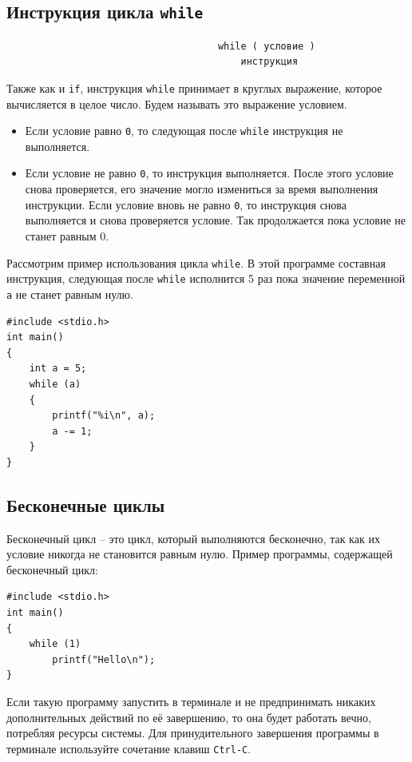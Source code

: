 \documentclass{article}
\begin{document}
\subsection*{Инструкция цикла \texttt{while}}
\begin{lstlisting}
                                     while ( условие )
                                         инструкция
\end{lstlisting}
Также как и \texttt{if}, инструкция \texttt{while} принимает в круглых выражение, которое вычисляется в целое число. Будем называть это выражение условием.
\begin{itemize}
\item Если условие равно \texttt{0}, то следующая после \texttt{while} инструкция не выполняется.
\item Если условие не равно \texttt{0}, то инструкция выполняется. После этого условие снова проверяется, его значение могло измениться за время выполнения инструкции.
Если условие вновь не равно \texttt{0}, то инструкция снова выполняется и снова проверяется условие.
Так продолжается пока условие не станет равным 0.
\end{itemize}
Рассмотрим пример использования цикла \texttt{while}. В этой программе составная инструкция, следующая после \texttt{while} исполнится 5 раз пока значение переменной \texttt{a} не станет равным нулю.
\begin{lstlisting}
#include <stdio.h>
int main()
{
    int a = 5;
    while (a)
    {
        printf("%i\n", a);
        a -= 1;
    }
}
\end{lstlisting}


\subsection*{Бесконечные циклы}
Бесконечный цикл -- это цикл, который выполняются бесконечно, так как их условие никогда не становится равным нулю. Пример программы, содержащей бесконечный цикл:
\begin{lstlisting}
#include <stdio.h>
int main()
{
    while (1)
        printf("Hello\n");
}
\end{lstlisting}
Если такую программу запустить в терминале и не предпринимать никаких дополнительных действий по её завершению, то она будет работать вечно, потребляя ресурсы системы. Для принудительного завершения программы в терминале используйте сочетание клавиш \texttt{Ctrl-C}.
\end{document}
